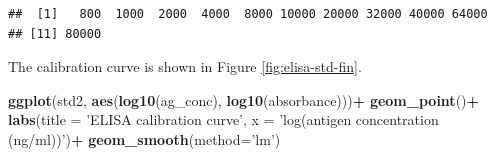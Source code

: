 \documentclass[
]{article}
\newenvironment{Shaded}{\begin{snugshade}}{\end{snugshade}}
\newcommand{\CommentTok}[1]{\textcolor[rgb]{0.56,0.35,0.01}{\textit{#1}}}
\newcommand{\ControlFlowTok}[1]{\textcolor[rgb]{0.13,0.29,0.53}{\textbf{#1}}}
\newcommand{\DataTypeTok}[1]{\textcolor[rgb]{0.13,0.29,0.53}{#1}}
\newcommand{\DecValTok}[1]{\textcolor[rgb]{0.00,0.00,0.81}{#1}}
\newcommand{\KeywordTok}[1]{\textcolor[rgb]{0.13,0.29,0.53}{\textbf{#1}}}
\newcommand{\NormalTok}[1]{#1}
\newcommand{\OperatorTok}[1]{\textcolor[rgb]{0.81,0.36,0.00}{\textbf{#1}}}
\newcommand{\StringTok}[1]{\textcolor[rgb]{0.31,0.60,0.02}{#1}}
\begin{document}
\begin{Shaded}
\end{Shaded}

\begin{verbatim}
##  [1]   800  1000  2000  4000  8000 10000 20000 32000 40000 64000
## [11] 80000
\end{verbatim}

The calibration curve is shown in Figure \ref{fig:elisa-std-fin}.

\begin{Shaded}
\begin{Highlighting}[]
\KeywordTok{ggplot}\NormalTok{(std2, }\KeywordTok{aes}\NormalTok{(}\KeywordTok{log10}\NormalTok{(ag_conc), }\KeywordTok{log10}\NormalTok{(absorbance)))}\OperatorTok{+}
\StringTok{  }\KeywordTok{geom_point}\NormalTok{()}\OperatorTok{+}
\StringTok{  }\KeywordTok{labs}\NormalTok{(}\DataTypeTok{title =} \StringTok{'ELISA calibration curve'}\NormalTok{,}
       \DataTypeTok{x =} \StringTok{'log(antigen concentration (ng/ml))'}\NormalTok{)}\OperatorTok{+}
\StringTok{  }\KeywordTok{geom_smooth}\NormalTok{(}\DataTypeTok{method=}\StringTok{'lm'}\NormalTok{)}
\end{Highlighting}
\end{Shaded}
\end{document}
